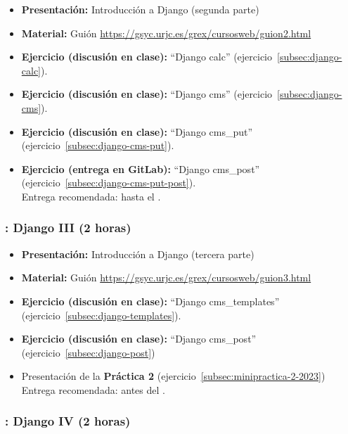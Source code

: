 \documentclass[a4paper,12pt]{article}
\begin{document}
\begin{itemize}
 \item \textbf{Presentación:} Introducción a Django (segunda parte)
  \item \textbf{Material:} Guión \url{https://gsyc.urjc.es/grex/cursosweb/guion2.html}
 \item \textbf{Ejercicio (discusión en clase):} ``Django calc'' (ejercicio~\ref{subsec:django-calc}).
 \item \textbf{Ejercicio  (discusión en clase):} ``Django cms'' (ejercicio~\ref{subsec:django-cms}). \\
 \item \textbf{Ejercicio (discusión en clase):} ``Django cms\_put'' (ejercicio~\ref{subsec:django-cms-put}).\\
 \item \textbf{Ejercicio (entrega en GitLab):} ``Django cms\_post'' (ejercicio~\ref{subsec:django-cms-put-post}). \\
  Entrega recomendada: hasta el \juevesI.
\end{itemize}

\subsubsection{\juevesI: Django III (2 horas)}
\label{cal:juevesI}

\begin{itemize}
 \item \textbf{Presentación:} Introducción a Django (tercera parte)
  \item \textbf{Material:} Guión \url{https://gsyc.urjc.es/grex/cursosweb/guion3.html}
 \item \textbf{Ejercicio (discusión en clase):} ``Django cms\_templates'' (ejercicio~\ref{subsec:django-templates}).
 \item \textbf{Ejercicio (discusión en clase):} ``Django cms\_post'' (ejercicio~\ref{subsec:django-post}) \\
  \item Presentación de la \textbf{Práctica 2} (ejercicio~\ref{subsec:minipractica-2-2023}) \\
  Entrega recomendada: antes del \juevesK.
\end{itemize}

\subsubsection{\juevesJ: Django IV (2 horas)}
\label{cal:juevesJ}
\end{document}
